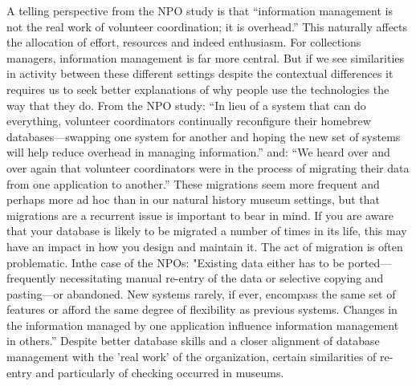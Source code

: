 A telling perspective from the NPO study is that “information management is not the real work of volunteer coordination; it is overhead.” This naturally affects the allocation of effort, resources and indeed enthusiasm. For collections managers, information management is far more central. But if we see similarities in activity between these different settings despite the contextual differences it requires us to seek better explanations of why people use the technologies the way that they do. From the NPO study: “In lieu of a system that can do everything, volunteer coordinators continually reconfigure their homebrew databases—swapping one system for another and hoping the new set of systems will help reduce overhead in managing information.”  and: “We heard over and over again that volunteer coordinators were in the process of migrating their data from one application to another.” These migrations seem more frequent and perhaps more ad hoc than in our natural history museum settings, but that migrations are a recurrent issue is important to bear in mind. If you are aware that your database is likely to be migrated a number of times in its life, this may have an impact in how you design and maintain it. The act of migration is often problematic. Inthe case of the NPOs: "Existing data either has to be ported—frequently necessitating manual re-entry of the data or selective copying and pasting—or abandoned. New systems rarely, if ever, encompass the same set of features or afford the same degree of flexibility as previous systems. Changes in the information managed by one application influence information management in others.” Despite better database skills and a closer alignment of database management with the 'real work' of the organization, certain similarities of re-entry and particularly of checking occurred in museums.

